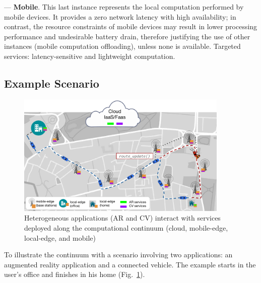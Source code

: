 --- \textbf{Mobile}. This last instance represents the local computation performed by mobile devices. It provides a zero network latency with high availability; in contrast, the resource constraints of mobile devices may result in lower processing performance and undesirable battery drain, therefore justifying the use of other instances (mobile computation offloading), unless none is available. Targeted services: latency-sensitive and lightweight computation.


%
%
	
\subsection{Example Scenario}

\begin{figure}[tbp]
	\includegraphics[width=0.9\textwidth]{figs/Continuum-Scenario}
	\caption{Heterogeneous applications (AR and CV) interact with services deployed along the computational continuum (cloud, mobile-edge, local-edge, and mobile)}
	\label{fig:continuum-scenario}
\end{figure}


To illustrate the continuum with a scenario involving two applications: an augmented reality application and a connected vehicle. The example starts in the user's office and finishes in his home (Fig.~\ref{fig:continuum-scenario}). 

